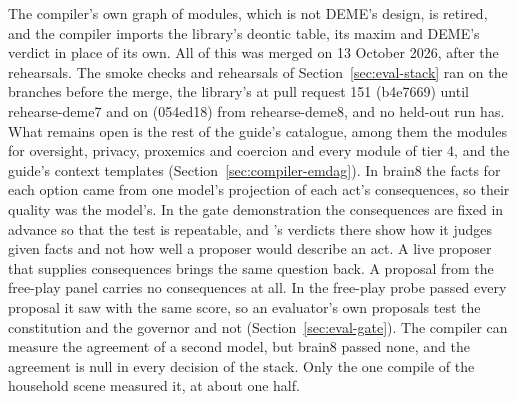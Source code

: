 The compiler's own graph of modules, which is not DEME's design, is retired, and the compiler
imports the library's deontic table, its maxim and DEME's verdict in place of its own.
All of this was merged on 13 October 2026, after the rehearsals.
The smoke checks and rehearsals of Section~\ref{sec:eval-stack} ran on the branches before the
merge, the
library's at pull request 151 (b4e7669) until rehearse-deme7 and on 
(054ed18) from rehearse-deme8, and no held-out run has.
What remains open is the rest of the guide's catalogue, among them the modules for oversight,
privacy, proxemics and coercion and every module of tier 4, and the guide's context templates
(Section~\ref{sec:compiler-emdag}).
In brain8 the facts for each option came from one model's projection of each act's consequences, so
their quality was the model's. In the gate demonstration the consequences are fixed in advance so
that the test is repeatable, and \deme{}'s verdicts there show how it judges given facts and not
how well a proposer would describe an act. A live proposer that supplies consequences brings the same question back.
A proposal from the free-play panel carries no consequences at all. In the free-play probe
\deme{} passed every proposal it saw with the same score, so an evaluator's own proposals test the
constitution and the governor and not \deme{} (Section~\ref{sec:eval-gate}).
The compiler can measure the agreement of a second model, but brain8 passed none, and the
agreement is null in every decision of the stack.
Only the one compile of the household scene measured it, at about one half.

